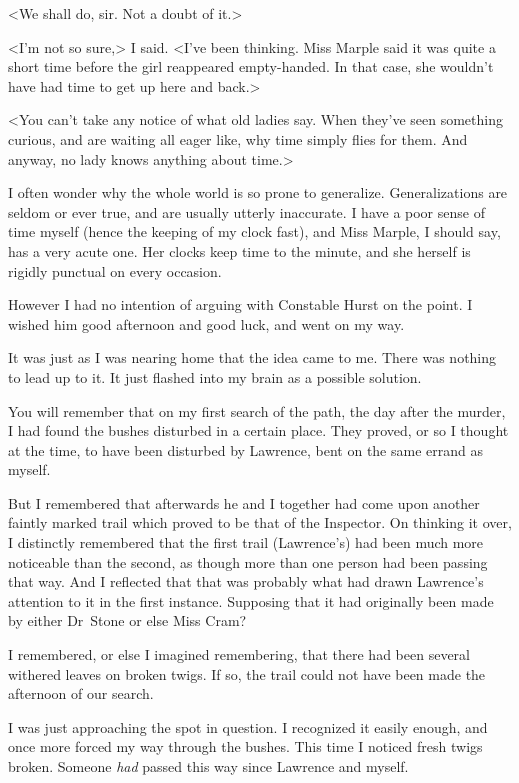<We shall do, sir. Not a doubt of it.>

<I'm not so sure,> I said. <I've been thinking. Miss Marple said it was quite a short time before the girl reappeared empty-handed. In that case, she wouldn't have had time to get up here and back.>

<You can't take any notice of what old ladies say. When they've seen something curious, and are waiting all eager like, why time simply flies for them. And anyway, no lady knows anything about time.>

I often wonder why the whole world is so prone to generalize. Generalizations are seldom or ever true, and are usually utterly inaccurate. I have a poor sense of time myself (hence the keeping of my clock fast), and Miss Marple, I should say, has a very acute one. Her clocks keep time to the minute, and she herself is rigidly punctual on every occasion.

However I had no intention of arguing with Constable Hurst on the point. I wished him good afternoon and good luck, and went on my way.

It was just as I was nearing home that the idea came to me. There was nothing to lead up to it. It just flashed into my brain as a possible solution.

You will remember that on my first search of the path, the day after the murder, I had found the bushes disturbed in a certain place. They proved, or so I thought at the time, to have been disturbed by Lawrence, bent on the same errand as myself.

But I remembered that afterwards he and I together had come upon another faintly marked trail which proved to be that of the Inspector. On thinking it over, I distinctly remembered that the first trail (Lawrence's) had been much more noticeable than the second, as though more than one person had been passing that way. And I reflected that that was probably what had drawn Lawrence's attention to it in the first instance. Supposing that it had originally been made by either Dr~Stone or else Miss Cram?

I remembered, or else I imagined remembering, that there had been several withered leaves on broken twigs. If so, the trail could not have been made the afternoon of our search.

I was just approaching the spot in question. I recognized it easily enough, and once more forced my way through the bushes. This time I noticed fresh twigs broken. Someone \emph{had} passed this way since Lawrence and myself.


